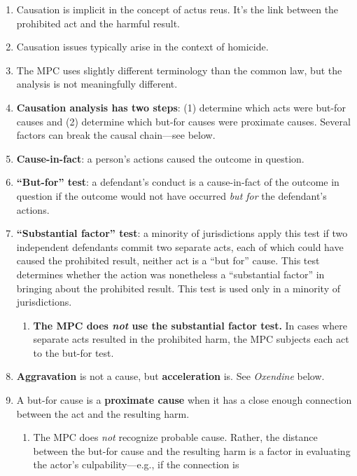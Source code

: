 \begin{enumerate}
    \item Causation is implicit in the concept of actus reus. It's the link 
    between the prohibited act and the harmful result.
    \item Causation issues typically arise in the context of homicide.
    \item The MPC uses slightly different terminology than the common law, but 
    the analysis is not meaningfully different.
    \item \textbf{Causation analysis has two steps}: (1) determine which acts were 
    but-for causes and (2) determine which but-for causes were proximate 
    causes. Several factors can break the causal chain---see below.
    \item \textbf{Cause-in-fact}: a person's actions caused the outcome in 
    question.
    \item \textbf{``But-for'' test}: a defendant's conduct is a cause-in-fact 
    of the outcome in question if the outcome would not have occurred 
    \emph{but for} the defendant's actions.
    \item \textbf{``Substantial factor'' test}: a minority of jurisdictions 
    apply this test if two independent defendants commit two separate acts, 
    each of which could have caused the prohibited result, neither act is a 
    ``but for'' cause. This test determines whether the action was nonetheless 
    a ``substantial factor'' in bringing about the prohibited result. This 
    test is used only in a minority of jurisdictions.
    \begin{enumerate}
        \item \textbf{The MPC does \emph{not} use the substantial factor 
        test.} In cases where separate acts resulted in the prohibited harm, 
        the MPC subjects each act to the but-for test.
    \end{enumerate}
    \item \textbf{Aggravation} is not a cause, but \textbf{acceleration} is. 
    See \emph{Oxendine} below.
    \item A but-for cause is a \textbf{proximate cause} when it has a close 
    enough connection between the act and the resulting harm.
    \begin{enumerate}
        \item The MPC does \emph{not} recognize probable cause. Rather, the 
        distance between the but-for cause and the resulting harm is a factor 
        in evaluating the actor's culpability---e.g., if the connection is 

\end{enumerate}
\end{enumerate}
